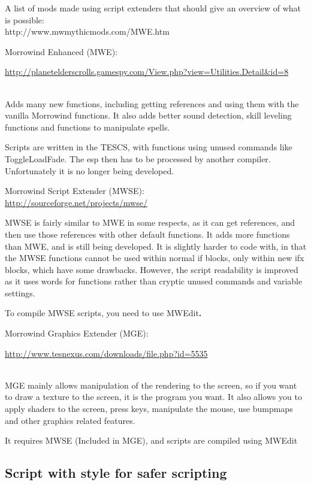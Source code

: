 A list of mods made using script extenders that should give an overview
of what is possible:\\
http://www.mwmythicmods.com/MWE.htm

Morrowind Enhanced (MWE):

\url{http://planetelderscrolls.gamespy.com/View.php?view=Utilities.Detail\&id=8}\strut \\
Adds many new functions, including getting references and using them
with the vanilla Morrowind functions. It also adds better sound
detection, skill leveling functions and functions to manipulate spells.

Scripts are written in the TESCS, with functions using unused commands
like ToggleLoadFade. The esp then has to be processed by another
compiler.\\
Unfortunately it is no longer being developed.

Morrowind Script Extender (MWSE):\\
\url{http://sourceforge.net/projects/mwse/}

MWSE is fairly similar to MWE in some respects, as it can get
references, and then use those references with other default functions.
It adds more functions than MWE, and is still being developed. It is
slightly harder to code with, in that the MWSE functions cannot be used
within normal if blocks, only within new ifx blocks, which have some
drawbacks. However, the script readability is improved as it uses words
for functions rather than cryptic unused commands and variable settings.

To compile MWSE scripts, you need to use MWEdit\textbf{.}

Morrowind Graphics Extender (MGE):

\url{http://www.tesnexus.com/downloads/file.php?id=5535}\strut \\
MGE mainly allows manipulation of the rendering to the screen, so if you
want to draw a texture to the screen, it is the program you want. It
also allows you to apply shaders to the screen, press keys, manipulate
the mouse, use bumpmaps and other graphics related features.

It requires MWSE (Included in MGE), and scripts are compiled using
MWEdit

\hypertarget{script-with-style-for-safer-scripting}{%
\subsection{Script with style for safer
scripting}\label{script-with-style-for-safer-scripting}}

